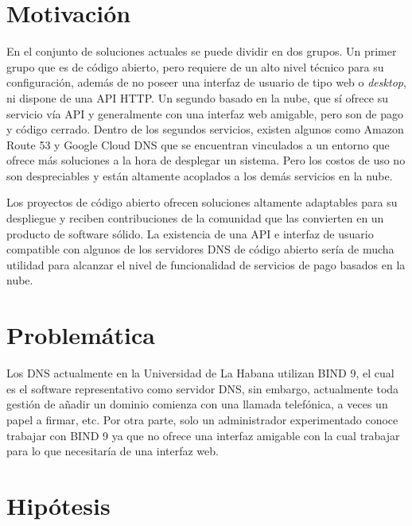 \section{Motivación}

En el conjunto de soluciones actuales se puede dividir en dos grupos. Un primer grupo que es de código abierto, pero requiere de un alto nivel técnico para su configuración, además de no poseer una interfaz de usuario de tipo web o \textit{desktop}, ni dispone de una API HTTP. Un segundo basado en la nube, que sí ofrece su servicio vía API y generalmente con una interfaz web amigable, pero son de pago y código cerrado. Dentro de los segundos servicios, existen algunos como Amazon Route 53 y Google Cloud DNS que se encuentran vinculados a un entorno que ofrece más soluciones a la hora de desplegar un sistema. Pero los costos de uso no son despreciables y están altamente acoplados a los demás servicios en la nube.

Los proyectos de código abierto ofrecen soluciones altamente adaptables para su despliegue y reciben contribuciones de la comunidad que las convierten en un producto  de software sólido. La existencia de una API e interfaz de usuario compatible con algunos de los servidores DNS de código abierto sería de mucha utilidad para alcanzar el nivel de funcionalidad de servicios de pago basados en la nube.



\section{Problemática}

Los DNS actualmente en la Universidad de La Habana utilizan BIND 9, el cual es el software representativo como servidor DNS, sin embargo, actualmente toda gestión de añadir un dominio comienza con una llamada telefónica, a veces un papel a firmar, etc. Por otra parte, solo un administrador experimentado conoce trabajar con BIND 9 ya que no ofrece una interfaz amigable con la cual trabajar para lo que necesitaría de una interfaz web.

\section{Hipótesis}


